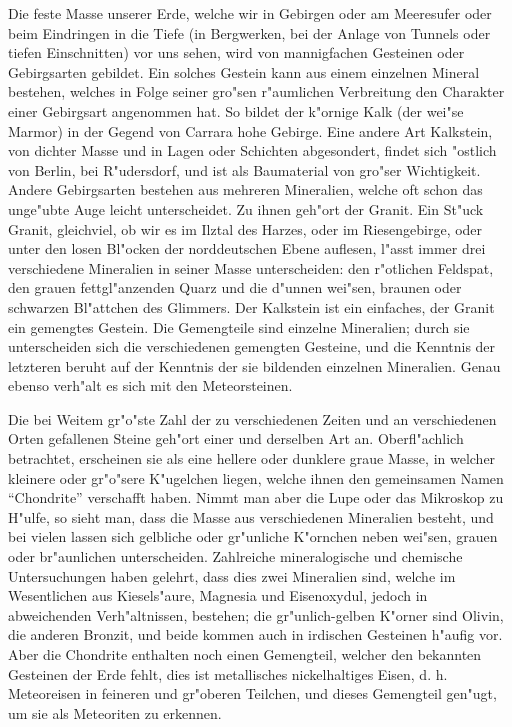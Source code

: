 \documentclass[a4paper, 11pt, oneside, german]{article}
\begin{document}
Die feste Masse unserer Erde, welche wir in Gebirgen oder am Meeresufer oder beim Eindringen in die Tiefe (in Bergwerken, bei der Anlage von Tunnels oder tiefen Einschnitten) vor uns sehen, wird von mannigfachen Gesteinen oder Gebirgsarten gebildet. Ein solches Gestein kann aus einem einzelnen Mineral bestehen, welches in Folge seiner gro"sen r"aumlichen Verbreitung den Charakter einer Gebirgsart angenommen hat. So bildet der k"ornige Kalk (der wei"se Marmor) in der Gegend von Carrara hohe Gebirge. Eine andere Art Kalkstein, von dichter Masse und in Lagen oder Schichten abgesondert, findet sich "ostlich von Berlin, bei R"udersdorf, und ist als Baumaterial von gro"ser Wichtigkeit. Andere Gebirgsarten bestehen aus mehreren Mineralien, welche oft schon das unge"ubte Auge leicht unterscheidet. Zu ihnen geh"ort der Granit. Ein St"uck Granit, gleichviel, ob wir es im Ilztal des Harzes, oder im Riesengebirge, oder unter den losen Bl"ocken der norddeutschen Ebene auflesen, l"asst immer drei verschiedene Mineralien in seiner Masse unterscheiden: den r"otlichen Feldspat, den grauen fettgl"anzenden Quarz und die d"unnen wei"sen, braunen oder schwarzen Bl"attchen des Glimmers. Der Kalkstein ist ein einfaches, der Granit ein gemengtes Gestein. Die Gemengteile sind einzelne Mineralien; durch sie unterscheiden sich die verschiedenen gemengten Gesteine, und die Kenntnis der letzteren beruht auf der Kenntnis der sie bildenden einzelnen Mineralien. Genau ebenso verh"alt es sich mit den Meteorsteinen.

Die bei Weitem gr"o"ste Zahl der zu verschiedenen Zeiten und an verschiedenen Orten gefallenen Steine geh"ort einer und derselben Art an. Oberfl"achlich betrachtet, erscheinen sie als eine hellere oder dunklere graue Masse, in welcher kleinere oder gr"o"sere K"ugelchen liegen, welche ihnen den gemeinsamen Namen "`Chondrite"' verschafft haben. Nimmt man aber die Lupe oder das Mikroskop zu H"ulfe, so sieht man, dass die Masse aus verschiedenen Mineralien besteht, und bei vielen lassen sich gelbliche oder gr"unliche K"ornchen neben wei"sen, grauen oder br"aunlichen unterscheiden. Zahlreiche mineralogische und chemische Untersuchungen haben gelehrt, dass dies zwei Mineralien sind, welche im Wesentlichen aus Kiesels"aure, Magnesia und Eisenoxydul, jedoch in abweichenden Verh"altnissen, bestehen; die gr"unlich-gelben K"orner sind Olivin, die anderen Bronzit, und beide kommen auch in irdischen Gesteinen h"aufig vor. Aber die Chondrite enthalten noch einen Gemengteil, welcher den bekannten Gesteinen der Erde fehlt, dies ist metallisches nickelhaltiges Eisen, d. h. Meteoreisen in feineren und gr"oberen Teilchen, und dieses Gemengteil gen"ugt, um sie als Meteoriten zu erkennen.
\end{document}
